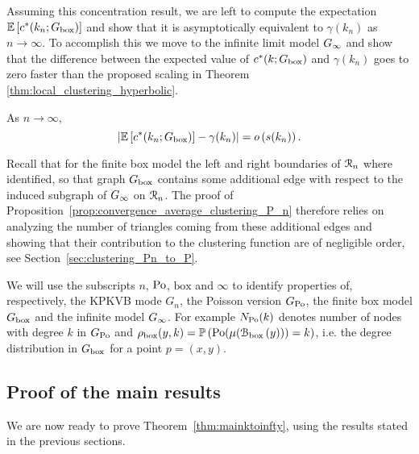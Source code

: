 Assuming this concentration result, we are left to compute the expectation $\mathbb{E}\left[c^\ast(k_n; G_{\mathrm{box}})\right]$ and show that it is asymptotically equivalent to $\gamma(k_n)$ as $n \to \infty$. To accomplish this we move to the infinite limit model $G_{\infty}$ and show that the difference between the expected value of $c^\ast(k;G_{\mathrm{box}})$ and $\gamma(k_n)$ goes to zero faster than the proposed scaling in Theorem \ref{thm:local_clustering_hyperbolic}.

\begin{proposition}\label{prop:convergence_average_clustering_P_n}
As $n \to \infty$,
\[
	\left|\mathbb{E}\left[c^\ast(k_n; G_{\mathrm{box}})\right] - \gamma(k_n)\right| = o\left(s(k_n)\right).
\]
\end{proposition}

Recall that for the finite box model the left and right boundaries of ${\mathcal R}_n$ where identified, so that graph $G_{\mathrm{box}}$ contains some additional edge with respect to the induced subgraph of $G_{\infty}$ on ${\mathcal R}_n$. The proof of Proposition~\ref{prop:convergence_average_clustering_P_n} therefore relies on analyzing the number of triangles coming from these additional edges and showing that their contribution to the clustering function are of negligible order, see Section~\ref{sec:clustering_Pn_to_P}. 

\begin{remark}
We will use the subscripts $n$, ${\mathrm{Po}}$, $\text{box}$ and $\infty$ to identify properties of, respectively, the KPKVB mode $G_n$, the Poisson version $G_{{\mathrm{Po}}}$, the finite box model $G_{\mathrm{box}}$ and the infinite model $G_{\infty}$. For example $N_{{\mathrm{Po}}}(k)$ denotes number of nodes with degree $k$ in $G_{{\mathrm{Po}}}$ and $\rho_{\text{box}}(y,k) = \mathbb{P}\left({\mathrm{Po}}(\mu({\mathcal B}_{\text{box}}\left(y\right))) = k\right)$, i.e. the degree distribution in $G_{\mathrm{box}}$ for a point $p = (x,y)$.
\end{remark}

\subsection{Proof of the main results}\label{ssec:proof_main_result_diverging_k}

We are now ready to prove Theorem~\ref{thm:mainktoinfty}, using the results stated in the previous sections.

